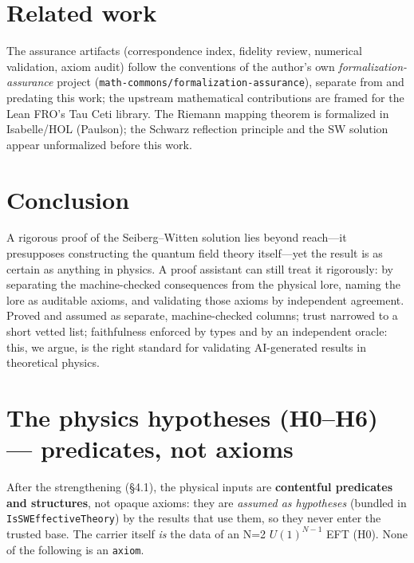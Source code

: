 \documentclass[11pt]{article}
\newcommand{\code}[1]{\texttt{#1}}
\begin{document}
\section{Related work}

The assurance artifacts (correspondence index, fidelity review, numerical validation, axiom
audit) follow the conventions of the author's own \emph{formalization-assurance} project
(\code{math-commons/\discretionary{}{}{}formalization-assurance}), separate from and predating this work; the
upstream mathematical contributions are framed for the Lean FRO's Tau Ceti library. The Riemann mapping theorem is formalized in
Isabelle/HOL (Paulson); the Schwarz reflection principle and the SW solution appear
unformalized before this work.

\section{Conclusion}

A rigorous proof of the Seiberg--Witten solution lies beyond reach---it presupposes
constructing the quantum field theory itself---yet the result is as certain as anything in
physics. A proof assistant can still treat it rigorously: by separating the machine-checked
consequences from the physical lore, naming the lore as auditable axioms, and validating those
axioms by independent agreement. Proved and assumed as separate, machine-checked columns; trust
narrowed to a short vetted list; faithfulness enforced by types and by an independent oracle:
this, we argue, is the right standard for validating AI-generated results in theoretical
physics.

\appendix

\section{The physics hypotheses (H0--H6) --- predicates, not axioms}

After the strengthening (\S4.1), the physical inputs are \textbf{contentful predicates and
structures}, not opaque axioms: they are \emph{assumed as hypotheses} (bundled in
\code{IsSWEffectiveTheory}) by the results that use them, so they never enter the trusted base.
The carrier itself \emph{is} the data of an N=2 $U(1)^{N-1}$ EFT (H0). None of the following is
an \code{axiom}.
\end{document}
